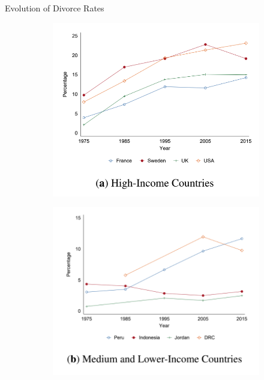 \documentclass[11pt,notes=hide,aspectratio=169,mathserif]{beamer}
\begin{document}
\begin{frame}{Evolution of Divorce Rates}
  \begin{figure}
    \centering
    \begin{subfigure}{0.48\textwidth}
      \centering
      \includegraphics[width=\linewidth]{hic_divorce.png}
    \end{subfigure}\hfill
    \begin{subfigure}{0.48\textwidth}
      \centering
      \includegraphics[width=\linewidth]{mlic_divorce.png}
    \end{subfigure}
  \end{figure}
  \end{frame}
  
\end{document}
